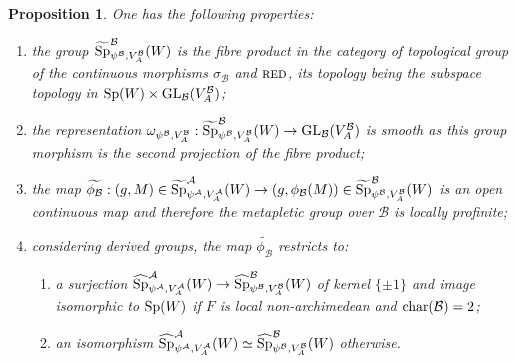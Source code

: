 \documentclass[11pt]{article}
\theoremstyle{plain}
\newtheorem{prop}[theo]{Proposition}
\theoremstyle{definition}
\theoremstyle{plain}
\theoremstyle{definition}
\theoremstyle{plain}
\begin{document}
\begin{prop} \label{metaplectic_group_over_B_prop} One has the following properties:
\begin{enumerate}[label=\textup{\alph*)}]
\item the group $\widetilde{\textup{Sp}}_{\psi^\mathcal{B},V_A^\mathcal{B}}^\mathcal{B}(W)$ is the fibre product in the category of topological group of the continuous morphisms $\sigma_\mathcal{B}$ and $\textup{\textsc{red}}$, its topology being the subspace topology in $\textup{Sp}(W) \times \textup{GL}_\mathcal{B}(V_A^\mathcal{B})$;
\item the representation $\omega_{\psi^\mathcal{B},V_A^\mathcal{B}} : \widetilde{\textup{Sp}}_{\psi^\mathcal{B},V_A^\mathcal{B}}^\mathcal{B}(W)  \to \textup{GL}_\mathcal{B}(V_A^\mathcal{B})$ is smooth as this group morphism is the second projection of the fibre product;
\item the map $\widetilde{\phi_\mathcal{B}} : (g,M) \in \widetilde{\textup{Sp}}_{\psi^\mathcal{A},V_A^\mathcal{A}}^\mathcal{A}(W) \to (g,\phi_\mathcal{B}(M)) \in \widetilde{\textup{Sp}}_{\psi^\mathcal{B},V_A^\mathcal{B}}^\mathcal{B}(W)$ is an open continuous map and therefore the metapletic group over $\mathcal{B}$ is locally profinite;
\item considering derived groups, the map $\widetilde{\phi_\mathcal{B}}$ restricts to:
\begin{enumerate} \item[i)] a surjection $\widehat{\textup{Sp}}_{\psi^\mathcal{A},V_A^\mathcal{A}}^\mathcal{A}(W) \to \widehat{\textup{Sp}}_{\psi^\mathcal{B},V_A^\mathcal{B}}^\mathcal{B}(W)$ of kernel $\{\pm 1 \}$ and image isomorphic to $\textup{Sp}(W)$ if $F$ is local non-archimedean and $\textup{char}(\mathcal{B})=2$;
\item[ii)] an isomorphism $\widehat{\textup{Sp}}_{\psi^\mathcal{A},V_A^\mathcal{A}}^\mathcal{A}(W) \simeq \widehat{\textup{Sp}}_{\psi^\mathcal{B},V_A^\mathcal{B}}^\mathcal{B}(W)$ otherwise. \end{enumerate} \end{enumerate} \end{prop}
\end{document}
